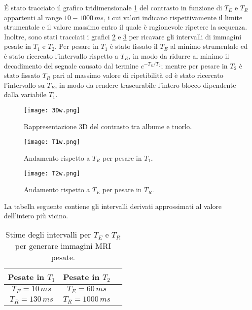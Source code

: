 \'E stato tracciato il grafico tridimensionale \ref{fig:3D} del contrasto in funzione di $T_E$ e $T_R$ appartenti al range $10-1000\,ms$, i cui valori indicano rispettivamente il limite strumentale e il valore massimo entro il quale è ragionevole ripetere la sequenza. 
Inoltre, sono stati tracciati i grafici \ref{subfig:T1} e \ref{subfig:T2} per ricavare gli intervalli di immagini pesate in $T_1$ e $T_2$.
Per pesare in $T_1$ è stato fissato il $T_E$ al minimo strumentale ed è stato ricercato l'intervallo rispetto a $T_R$, in modo da ridurre al minimo il decadimento del segnale causato dal termine $e^{-T_E/T_2}$; mentre per pesare in $T_2$ è stato fissato $T_R$ pari al massimo valore di ripetibilità ed è stato ricercato l'intervallo su $T_E$, in modo da rendere trascurabile l'intero blocco dipendente dalla variabile $T_1$.

\begin{figure}
\centering
\texttt{[image: 3Dw.png]}
\caption{Rappresentazione 3D del contrasto tra albume e tuorlo.}\label{fig:3D}
\end{figure}

\begin{figure}
\centering
\texttt{[image: T1w.png]}
\caption{Andamento rispetto a $T_R$ per pesare in $T_1$.}\label{subfig:T1}
\end{figure}
\clearpage
\begin{figure}
\centering
\texttt{[image: T2w.png]}
\caption{Andamento rispetto a $T_E$ per pesare in $T_R$.}\label{subfig:T2}
\end{figure}

La tabella seguente contiene gli intervalli derivati approssimati al valore dell'intero più vicino.
\begin{table}
	\centering
	\begin{tabular}{ccc}
	\toprule
		\textbf{Pesate in $T_1$} &	\textbf{Pesate in $T_2$}	\\
	\midrule
		$T_E = 10\,ms$			&		$T_E = 60\,ms$	 \\	
		$T_R = 130\,ms$			&		$T_R = 1000\,ms$ \\
	\bottomrule
	\end{tabular}
	\caption{Stime degli intervalli per $T_E$ e $T_R$ per generare immagini MRI pesate.}\label{tab:Pesate}
\end{table}